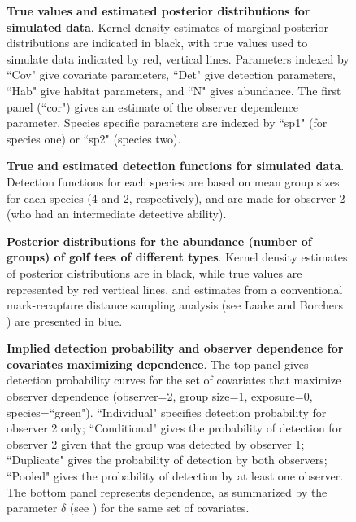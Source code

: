 \documentclass[10pt]{article}
\begin{document}
\begin{figure}
\caption{{\bf True values and estimated posterior distributions for simulated data}. Kernel density estimates of marginal posterior distributions are indicated in black, with true values used to simulate data indicated by red, vertical lines.  Parameters indexed by ``Cov" give covariate parameters, ``Det" give detection parameters, ``Hab" give habitat parameters, and ``N" gives abundance.  The first panel (``cor") gives an estimate of the observer dependence parameter. Species specific parameters are indexed by ``sp1" (for species one) or ``sp2" (species two). }
\label{fig:sim_posts}
\end{figure}


\begin{figure}
\caption{{\bf True and estimated detection functions for simulated data}.  Detection functions for each species are based on mean group sizes for each species (4 and 2, respectively), and are made for observer 2 (who had an intermediate detective ability).}
\label{fig:sim_detection}
\end{figure}

\begin{figure}
\caption{{\bf Posterior distributions for the abundance (number of groups) of golf tees of different types}. Kernel density estimates of posterior distributions are in black, while true values are represented by red vertical lines, and estimates from a conventional mark-recapture distance sampling analysis (see Laake and Borchers \cite{LaakeBorchers2004}) are presented in blue.}
\label{fig:tee_N}
\end{figure}

\begin{figure}
\caption{{\bf Implied detection probability and observer dependence for covariates maximizing dependence}. The top panel gives detection probability curves for the set of covariates that maximize observer dependence (observer=2, group size=1, exposure=0, species=``green").  ``Individual" specifies detection probability for observer 2 only; ``Conditional" gives the probability of detection for observer 2 given that the group was detected by observer 1; ``Duplicate" gives the probability of detection by both observers; ``Pooled" gives the probability of detection by at least one observer.  The bottom panel represents dependence, as summarized by the parameter $\delta$ (see \cite{BucklandEtAl2010}) for the same set of covariates.}
\label{fig:tee_cond_det}
\end{figure}
\clearpage
\end{document}
